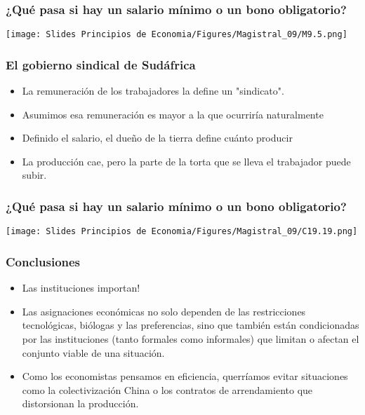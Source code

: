\documentclass{beamer}
\begin{document}
\begin{frame}
\frametitle{¿Qué pasa si hay un salario mínimo o un bono obligatorio?}
\centering
\texttt{[image: Slides Principios de Economia/Figures/Magistral\_09/M9.5.png]}
\end{frame}

\begin{frame}
\frametitle{El gobierno sindical de Sudáfrica}
\begin{itemize}
    \item La remuneración de los trabajadores la define un "sindicato". 
    \item  Asumimos esa remuneración es mayor a la que ocurriría naturalmente
    \item Definido el salario, el dueño de la tierra define cuánto producir
    \item  La producción cae, pero la parte de la torta que se lleva el trabajador puede subir. 
\end{itemize}
\end{frame}

\begin{frame}
\frametitle{¿Qué pasa si hay un salario mínimo o un bono obligatorio?}
\centering
\texttt{[image: Slides Principios de Economia/Figures/Magistral\_09/C19.19.png]}
\end{frame}

\begin{frame}
\frametitle{Conclusiones}
\begin{itemize}
    \item Las instituciones importan! \vspace{1mm}
    \item Las asignaciones económicas no solo dependen de las restricciones tecnológicas, biólogas y las preferencias, sino que también están condicionadas por las instituciones (tanto formales como informales) que limitan o afectan el conjunto viable de una situación.\vspace{1mm}
    \item Como los economistas pensamos en eficiencia,  querríamos evitar situaciones como la colectivización China o los contratos de arrendamiento que distorsionan la producción.
\end{itemize}
\end{frame}
\end{document}
